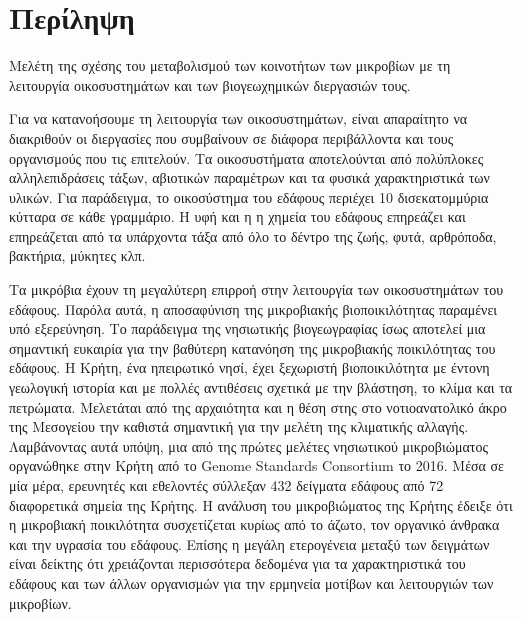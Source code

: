 \documentclass[11pt]{article}
\begin{document}
\section*{Περίληψη}
{\LARGE Μελέτη της σχέσης του μεταβολισμού των κοινοτήτων των μικροβίων με τη λειτουργία οικοσυστημάτων και των βιογεωχημικών διεργασιών τους.}


\vspace{1cm}

Για να κατανοήσουμε τη λειτουργία των οικοσυστημάτων, είναι απαραίτητο να διακριθούν
οι διεργασίες που συμβαίνουν σε διάφορα περιβάλλοντα και τους οργανισμούς
που τις επιτελούν. Τα οικοσυστήματα αποτελούνται από πολύπλοκες αλληλεπιδράσεις τάξων,
αβιοτικών παραμέτρων και τα φυσικά χαρακτηριστικά των υλικών. Για παράδειγμα,
το οικοσύστημα του εδάφους περιέχει 10 δισεκατομμύρια κύτταρα σε κάθε γραμμάριο. Η υφή και η
η χημεία του εδάφους επηρεάζει και επηρεάζεται από τα υπάρχοντα τάξα από όλο το
δέντρο της ζωής, φυτά, αρθρόποδα, βακτήρια, μύκητες κλπ.

Τα μικρόβια έχουν τη μεγαλύτερη επιρροή στην λειτουργία των οικοσυστημάτων του εδάφους. 
Παρόλα αυτά, η αποσαφύνιση της μικροβιακής βιοποικιλότητας παραμένει υπό εξερεύνηση.
Το παράδειγμα της νησιωτικής βιογεωγραφίας ίσως αποτελεί μια σημαντική ευκαιρία για 
την βαθύτερη κατανόηση της μικροβιακής ποικιλότητας του εδάφους. 
Η Κρήτη, ένα ηπειρωτικό νησί, έχει ξεχωριστή βιοποικιλότητα με έντονη γεωλογική 
ιστορία και με πολλές αντιθέσεις σχετικά με την βλάστηση, το κλίμα και τα πετρώματα. 
Μελετάται από της αρχαιότητα και η θέση στης στο νοτιοανατολικό άκρο της Μεσογείου 
την καθιστά σημαντική για την μελέτη της κλιματικής αλλαγής.
Λαμβάνοντας αυτά υπόψη, μια από της πρώτες μελέτες νησιωτικού μικροβιώματος 
οργανώθηκε στην Κρήτη από το \textlatin{Genome Standards Consortium} το 2016. 
Μέσα σε μία μέρα, ερευνητές και εθελοντές σύλλεξαν 432 δείγματα εδάφους 
από 72 διαφορετικά σημεία της Κρήτης. 
Η ανάλυση του μικροβιώματος της Κρήτης έδειξε ότι η μικροβιακή ποικιλότητα
συσχετίζεται κυρίως από το άζωτο, τον οργανικό άνθρακα και την υγρασία του εδάφους.
Επίσης η μεγάλη ετερογένεια μεταξύ των δειγμάτων είναι δείκτης ότι χρειάζονται περισσότερα 
δεδομένα για τα χαρακτηριστικά του εδάφους και των άλλων οργανισμών για την ερμηνεία μοτίβων και λειτουργιών 
των μικροβίων.
\end{document}
